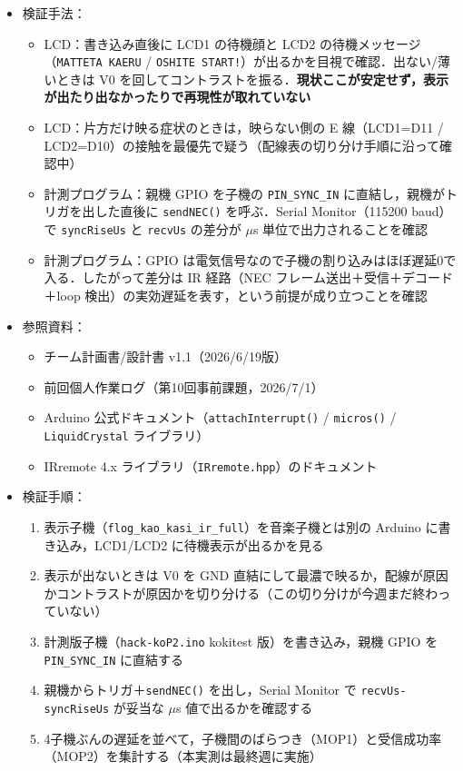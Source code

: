 \documentclass[a4paper,11pt]{ltjsarticle}
\providecommand{\％}{\%}
\begin{document}
\begin{itemize}
    \item 検証手法：
    \begin{itemize}
        \item LCD：書き込み直後に LCD1 の待機顔と LCD2 の待機メッセージ（\texttt{MATTETA KAERU} / \texttt{OSHITE START!}）が出るかを目視で確認．出ない/薄いときは V0 を回してコントラストを振る．\textbf{現状ここが安定せず，表示が出たり出なかったりで再現性が取れていない}
        \item LCD：片方だけ映る症状のときは，映らない側の E 線（LCD1=D11 / LCD2=D10）の接触を最優先で疑う（配線表の切り分け手順に沿って確認中）
        \item 計測プログラム：親機 GPIO を子機の \texttt{PIN\_SYNC\_IN} に直結し，親機がトリガを出した直後に \texttt{sendNEC()} を呼ぶ．Serial Monitor（115200 baud）で \texttt{syncRiseUs} と \texttt{recvUs} の差分が $\mu$s 単位で出力されることを確認
        \item 計測プログラム：GPIO は電気信号なので子機の割り込みはほぼ遅延0で入る．したがって差分は IR 経路（NEC フレーム送出＋受信＋デコード＋loop 検出）の実効遅延を表す，という前提が成り立つことを確認
    \end{itemize}
    \item 参照資料：
    \begin{itemize}
        \item チーム計画書/設計書 v1.1（2026/6/19版）
        \item 前回個人作業ログ（第10回事前課題，2026/7/1）
        \item Arduino 公式ドキュメント（\texttt{attachInterrupt()} / \texttt{micros()} / \texttt{LiquidCrystal} ライブラリ）
        \item IRremote 4.x ライブラリ（\texttt{IRremote.hpp}）のドキュメント
    \end{itemize}
    \item 検証手順：
    \begin{enumerate}
        \item 表示子機（\texttt{flog\_kao\_kasi\_ir\_full}）を音楽子機とは別の Arduino に書き込み，LCD1/LCD2 に待機表示が出るかを見る
        \item 表示が出ないときは V0 を GND 直結にして最濃で映るか，配線が原因かコントラストが原因かを切り分ける（この切り分けが今週まだ終わっていない）
        \item 計測版子機（\texttt{hack-koP2.ino} kokitest 版）を書き込み，親機 GPIO を \texttt{PIN\_SYNC\_IN} に直結する
        \item 親機からトリガ＋\texttt{sendNEC()} を出し，Serial Monitor で \texttt{recvUs-syncRiseUs} が妥当な $\mu$s 値で出るかを確認する
        \item 4子機ぶんの遅延を並べて，子機間のばらつき（MOP1）と受信成功率（MOP2）を集計する（本実測は最終週に実施）
    \end{enumerate}
\end{itemize}
\end{document}
